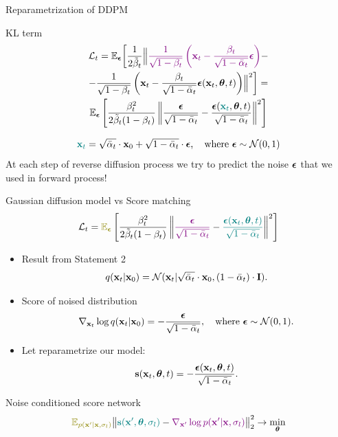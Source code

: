 \begin{frame}{Reparametrization of DDPM}
	\begin{block}{KL term}
		\vspace{-0.8cm}
		\begin{multline*}
			\mathcal{L}_t = \mathbb{E}_{\boldsymbol{\epsilon}} \biggl[ \frac{1}{2\tilde{\beta}_t} \Bigl\| {\color{violet} \frac{1}{\sqrt{1 - \beta_t}}\left( \mathbf{x}_t - \frac{\beta_t}{\sqrt{1 - \bar{\alpha}_t} } \boldsymbol{\epsilon} \right)} - \\
			- \frac{1}{\sqrt{1 - \beta_t}}\left( \mathbf{x}_t - \frac{\beta_t}{\sqrt{1 - \bar{\alpha}_t} } \boldsymbol{\epsilon}(\mathbf{x}_t, \boldsymbol{\theta}, t) \right)  \Bigr\|^2 \biggr] = \\
			\mathbb{E}_{\boldsymbol{\epsilon}} \left[ \frac{\beta_t^2}{2\tilde{\beta}_t (1 - \beta_t)} \left\| \frac{\boldsymbol{\epsilon}}{\sqrt{1 - \bar{\alpha}_t}} - \frac{\boldsymbol{\epsilon}({\color{teal}\mathbf{x}_t}, \boldsymbol{\theta}, t)}{\sqrt{1 - \bar{\alpha}_t}}\right\|^2 \right]
		\end{multline*}
	\end{block}
		\vspace{-0.5cm}
		\[
			{\color{teal}\mathbf{x}_t} = \sqrt{\bar{\alpha}_t} \cdot \mathbf{x}_{0} + \sqrt{1 - \bar{\alpha}_t} \cdot \boldsymbol{\epsilon}, \quad \text{where } \boldsymbol{\epsilon} \sim \mathcal{N}(0, 1)
		\]
	At each step of reverse diffusion process we try to predict the noise $\boldsymbol{\epsilon}$ that we used in forward process!
\end{frame}
\begin{frame}{Gaussian diffusion model vs Score matching}
	\vspace{-0.3cm}
	\[
		\cL_t = {\color{olive}\bbE_{\bepsilon}} \left[ \frac{\beta_t^2}{2\tilde{\beta}_t (1 - \beta_t)} \left\| {\color{violet}\frac{\bepsilon}{\sqrt{1 - \bar{\alpha}_t}}} - {\color{teal}\frac{\bepsilon(\bx_t, \btheta, t)}{\sqrt{1 - \bar{\alpha}_t}}}\right\|^2 \right]
	\]
	\begin{itemize}
		\item Result from Statement 2
		\[
			q(\mathbf{x}_t | \mathbf{x}_0) = \mathcal{N}(\mathbf{x}_t | \sqrt{\bar{\alpha}_t} \cdot \mathbf{x}_0, (1 - \bar{\alpha}_t) \cdot \mathbf{I}).
		\]
		\item Score of noised distribution
		\[
			\nabla_{\mathbf{x}_t} \log q(\mathbf{x}_t | \mathbf{x}_0) = - \frac{\boldsymbol{\epsilon}}{\sqrt{1 - \bar{\alpha}_t}}, \quad \text{where } \boldsymbol{\epsilon} \sim \mathcal{N}(0, 1).
		\]
		\item Let reparametrize our model: 
		\[
			\mathbf{s}(\mathbf{x}_t, \boldsymbol{\theta}, t) = - \frac{\boldsymbol{\epsilon}(\mathbf{x}_t, \boldsymbol{\theta}, t)}{\sqrt{1 - \bar{\alpha}_t}}.
		\]
	\end{itemize}
	\begin{block}{Noise conditioned score network}
		\vspace{-0.2cm}
		\[
			{\color{olive}\bbE_{p(\bx' | \bx, \sigma_l)}}\bigl\| {\color{teal}\bs(\bx', \btheta, \sigma_l)} - {\color{violet}\nabla_{\bx'} \log p(\bx' | \bx, \sigma_l)} \bigr\|^2_2 \rightarrow \min_{\btheta}
		\]
	\end{block}
	\end{frame}
